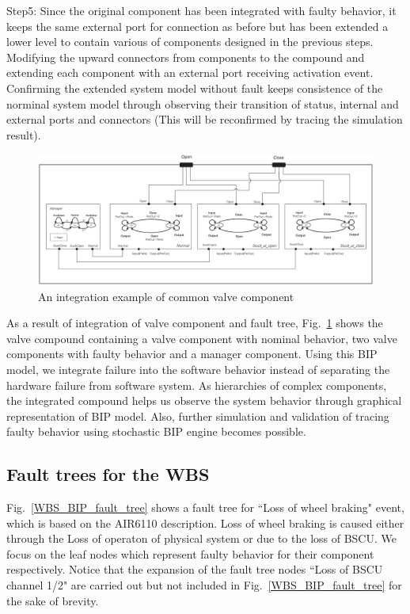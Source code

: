 Step5: Since the original component has been integrated with faulty behavior, it keeps the same external port for connection  as before but has been extended a lower level to contain various of components designed in the previous steps. Modifying the upward connectors from components to the compound and extending each component with an external port receiving activation event. Confirming the extended system model without fault keeps consistence of the norminal system model through observing their transition of status, internal and external ports and connectors (This will be reconfirmed by tracing the simulation result).

\begin{figure}[b]
	\centerline{\includegraphics[width=125mm]{figure/Example.eps}}
	\caption{An integration example of common valve component}
	\label{Example}
\end{figure}

As a result of integration of valve component and fault tree, Fig.~\ref{Example} shows the valve compound containing a valve component with nominal behavior, two valve components with faulty behavior and a manager component. Using this BIP model, we integrate failure into the software behavior instead of separating the hardware failure from software system. As hierarchies of complex components, the integrated compound helps us observe the system behavior through graphical representation of BIP model. Also, further simulation and validation of tracing faulty behavior using stochastic BIP engine becomes possible.


\subsection{Fault trees for the WBS}
Fig.~\ref{WBS_BIP_fault_tree} shows a fault tree for ``Loss of wheel braking" event, which is based on the AIR6110 description. Loss of wheel braking is caused either through the Loss of operaton of physical system or due to the loss of BSCU. We focus on the leaf nodes which represent faulty behavior for their component respectively. Notice that the expansion of the fault tree nodes ``Loss of BSCU channel 1/2" are carried out but not included in Fig.~\ref{WBS_BIP_fault_tree} for the sake of brevity.

